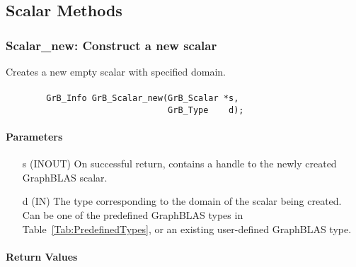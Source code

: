 \subsection{Scalar Methods}


\subsubsection{{\sf Scalar\_new}: Construct a new scalar}

Creates a new empty scalar with specified domain.

\paragraph{\syntax}

\begin{verbatim}
        GrB_Info GrB_Scalar_new(GrB_Scalar *s,
                                GrB_Type    d);
\end{verbatim}

\paragraph{Parameters}

\begin{itemize}[leftmargin=1.1in]
    \item[{\sf s}] ({\sf INOUT}) On successful return, contains a handle
                                 to the newly created GraphBLAS scalar.
    \item[{\sf d}] ({\sf IN})    The type corresponding to the domain of the 
                                 scalar being created.  Can be one of the 
                                 predefined GraphBLAS types in 
                                 Table~\ref{Tab:PredefinedTypes}, or an existing 
                                 user-defined GraphBLAS type.
\end{itemize}

\paragraph{Return Values}

